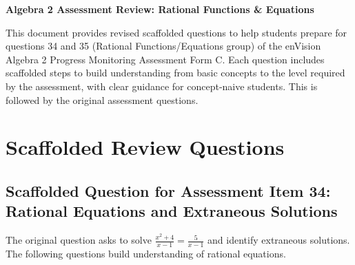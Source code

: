 \documentclass[12pt]{article}
\begin{document}
\begin{center}
    \textbf{Algebra 2 Assessment Review: Rational Functions \& Equations}
\end{center}

This document provides revised scaffolded questions to help students prepare for questions 34 and 35 (Rational Functions/Equations group) of the enVision Algebra 2 Progress Monitoring Assessment Form C. Each question includes scaffolded steps to build understanding from basic concepts to the level required by the assessment, with clear guidance for concept-naive students. This is followed by the original assessment questions.

\section*{Scaffolded Review Questions}

\subsection*{Scaffolded Question for Assessment Item 34: Rational Equations and Extraneous Solutions}
The original question asks to solve \( \frac{x^2 + 4}{x - 1} = \frac{5}{x - 1} \) and identify extraneous solutions. The following questions build understanding of rational equations.
\end{document}
